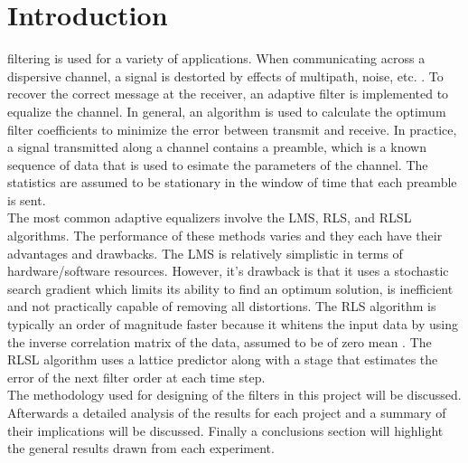 \documentclass[journal]{IEEEtran}
\begin{document}

%
\IEEEpeerreviewmaketitle

\small

\section{Introduction}
%
%
%
%
 filtering is used for a variety of applications. When communicating
across a dispersive channel, a signal is destorted by effects of multipath, noise, etc. \cite{goldenberg1985digital}.
To recover the correct message at the receiver, an adaptive filter is implemented to equalize the channel. In general, an
algorithm is used to calculate the optimum filter coefficients to minimize the error between transmit and receive. In practice, a
signal transmitted along a channel contains a preamble, which is a known sequence of data that is used to esimate the parameters of the channel.
The statistics are assumed to be stationary in the window of time that each preamble is sent. \\ \indent The most common adaptive equalizers involve
the LMS, RLS, and RLSL algorithms. The performance of these methods varies and they each have their advantages and drawbacks.
The LMS is relatively simplistic in terms of hardware/software resources. However, it's drawback is that it uses a stochastic search gradient
which limits its ability to find an optimum solution, is inefficient and not practically capable of removing all distortions. The RLS algorithm is typically an order of magnitude
faster because it whitens the input data by using the inverse correlation matrix of the data, assumed to be of zero mean \cite{lecturenotes}. The RLSL
algorithm uses a lattice predictor along with a stage that estimates the error of the next filter order at each time step.\\
\indent The methodology used for designing of the filters in this project will be discussed. Afterwards a detailed analysis of the results
for each project and a summary of their implications will be discussed. Finally a conclusions section will highlight the general results drawn from each
experiment.
\end{document}
